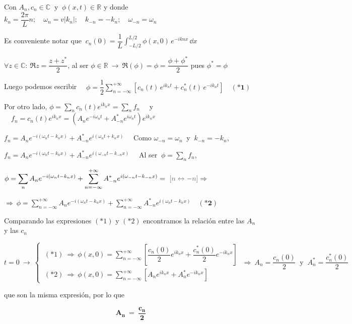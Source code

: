 Con $A_n,c_n \in \mathbb C \ \text{ y } \ \phi(x,t)\in \mathbb R$ y donde $k_n=\dfrac{2\pi}L n;\quad \omega_n=v|k_n|;\quad k_{-n}=-k_n;\quad \omega_{-n}=\omega_n$

Es conveniente notar que $\displaystyle \ c_n(0)=\dfrac 1 L \int_{-L/2}^{L/2} \phi(x,0)\, e^{-ikn x}\, \dd x$


\vspace{5mm} $\forall z\in \mathbb C:\ \Re{z}=\dfrac{z+z^*}2$, al ser $\phi \in \mathbb R \ \to \ \Re(\phi)=\phi=\dfrac{\phi+\phi^*}2$ pues $\phi^*=\phi$


Luego podemos escribir $\quad \phi=\dfrac 1 2 \displaystyle  \sum_{n=-\infty}^{+\infty}  \left[ c_n(t)\, e^{ik_n t}  + c_n^*(t)\, e^{-ik_n t}   \right] \quad \boldsymbol{(*1)}$

Por otro lado, $\phi=\sum_n c_n(t)e^{ik_nx}=\sum_n f_n \quad $ y $\quad f_n=c_n(t)e^{ik_nx}=(A_ne^{-i\omega_n t}+A^*_{-n}e^{i\omega_n t})e^{ik_n x}$

$f_n=A_ne^{-i(\omega_nt-k_nx)}+A^*_{-n}e^{i(\omega_nt+k_nx)}\quad $ Como $\omega_{-n}=\omega_n\ $ y $\ k_{-n}=-k_n$,

$f_n=A_ne^{-i(\omega_nt-k_nx)}+A^*_{-n}e^{i(\omega_{-n}t-k_{-n}x)}\quad $ Al ser $\ \phi=\sum_n f_n $,

$\phi=\displaystyle \sum_n A_ne^{-i(\omega_nt-k_nx)} + \sum_{n=-\infty}^{+\infty} A^*_{-n}e^{i(\omega_{-n}t-k_{-n}x)} = \ \textcolor{gris}{[n\leftrightarrow -n]}  \Rightarrow$

$\Rightarrow \  \displaystyle \phi = \sum_{n=-\infty}^{+\infty} A_ne^{-i(\omega_nt-k_nx)} +  
\sum_{n=-\infty}^{+\infty} A^*_{-n}e^{i(\omega_nt-k_nx)} \quad\boldsymbol{(*2)}$



Comparando las expresiones $(*1)$ y $(*2)$ encontramos la relación entre las $A_n$ y las $c_n$


$t=0 \ \to \ \begin{cases}
\  (*1) \ \Rightarrow \ 	\phi(x,0)=\displaystyle \sum_{n=-\infty}^{+\infty} \left[ \dfrac {c_n(0)}2 e^{ik_n x}+\dfrac {c^*_n(0)}2 e^{-ik_n x} \right] \\
\  (*2) \ \Rightarrow \ 	\phi(x,0)=\displaystyle \sum_{n=-\infty}^{+\infty}  \left[ A_n e^{ik_nx}+A^*_ne^{-ik_nx} \right]
 \end{cases} \ \Rightarrow \  A_n=\dfrac{c_n(0)}2 \ \text{ y } \  A^*_n=\dfrac{c^*_n(0)}2 \ $ 
 
 que son la misma expresión, por lo que


\begin{equation}
\label{app-DFT-AnYcn}
\boxed{ \ \boldsymbol{A_n \ = \ \dfrac {c_n}2} \ }
\end{equation}

